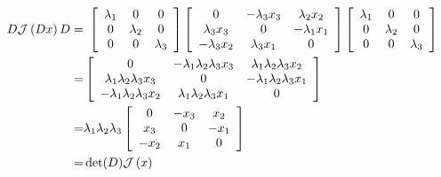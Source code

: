 \begin{align}
D\mathcal{J}\left( Dx \right) D
   =&\
    \left[ \begin{array}{ccc}
      \lambda_1  &      0           &      0               \\
          0          &   \lambda_2  &      0               \\
          0          &      0           & \lambda_3        \\
    \end{array} \right]
    \left[ \begin{array}{ccc}
               0       & -\lambda_3 x_3 &  \lambda_2 x_2    \\
         \lambda_3 x_3  &    0          & -\lambda_1 x_1    \\
        -\lambda_3 x_2  &  \lambda_3x_1 &    0              \\
    \end{array} \right]
    \left[ \begin{array}{ccc}
      \lambda_1      &      0           &      0           \\
          0          &   \lambda_2      &      0           \\
          0          &      0           & \lambda_3        \\
    \end{array} \right]
   \nonumber \\
   =&
    \left[ \begin{array}{ccc}
                       0  &  -\lambda_1\lambda_2\lambda_3x_3  &  \lambda_1\lambda_2\lambda_3x_2     \\
          \lambda_1\lambda_2\lambda_3x_3  &          0        &  -\lambda_1\lambda_2\lambda_3x_1    \\
         -\lambda_1\lambda_2\lambda_3x_2  &  \lambda_1\lambda_2\lambda_3x_1 &    0    \\
    \end{array} \right]
   \nonumber \\
   =&\lambda_1\lambda_2\lambda_3
    \left[ \begin{array}{ccc}
         0  &  -x_3  &  x_2     \\
         x_3  &  0  &  -x_1    \\
        -x_2  &  x_1 &    0    \\
    \end{array} \right]
   \nonumber \\
   =&\det(D)\mathcal{J}\left( x \right)
\end{align}



